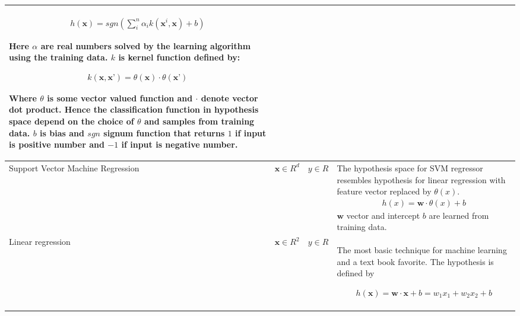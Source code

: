 \documentclass[english, 12pt, a4paper, elec, utf8, online]{aaltothesis}
\begin{document}
\begin{longtable}{ |p{3cm}|p{1.5cm}|p{2.2cm}|p{9cm}| }
\begin{align*}
h(\mathbf{x})=sgn(\sum_{i}^{n} \alpha_i k(\mathbf{x}^{i}, \mathbf{x}) + b)
\end{align*}

Here $\alpha$ are real numbers solved by the learning algorithm using the training data. $k$ is kernel function defined by:

\begin{align*}
k(\mathbf{x},\mathbf{x}’)= \theta(\mathbf{x}) \cdot \theta(\mathbf{x}’)
\end{align*} 

Where $\theta$ is some vector valued function and $\cdot$ denote vector dot product. Hence the classification function in hypothesis space depend on the choice of $\theta$ and samples from training data. $b$ is bias and $sgn$ signum function that returns $1$ if input is positive number and $-1$ if input is negative number.~\cite{lampert2009kernel}   
\\
\hline
Support Vector Machine \newline Regression
& $\mathbf{x} \in R^d$  
& $y \in R$ 
& The hypothesis space for SVM regressor resembles hypothesis for linear regression with feature vector replaced by $\theta(x)$.
\begin{align*}
h(x) = \mathbf{w} \cdot \theta(x)+ b
\end{align*}
$\mathbf{w}$ vector and intercept $b$ are learned from training data.~\cite{lampert2009kernel}    
\\
\hline
Linear regression  
& $\mathbf{x} \in R^2$  
& $y \in R$
& The most basic technique for machine learning and a text book favorite. The hypothesis is defined by

\begin{align*}
h(\mathbf{x}) = \mathbf{w} \cdot  \mathbf{x} + b = w_{1} x_{1} + w_{2} x_{2} + b
\end{align*}


\end{longtable}
\end{document}
